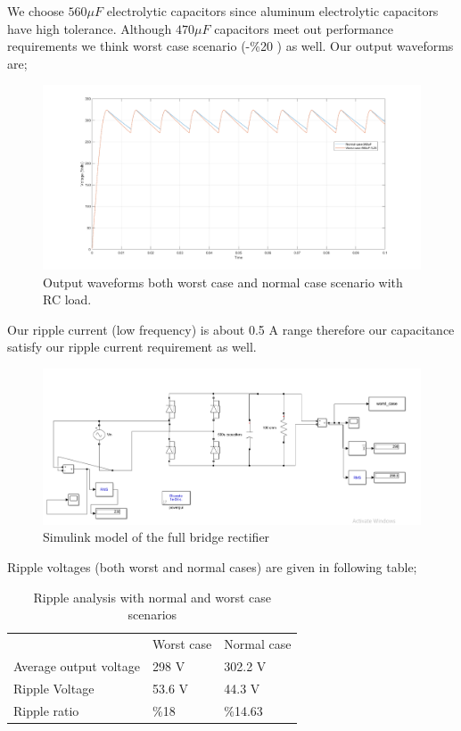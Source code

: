 \documentclass[fleqn, a4paper]{article}
\begin{document}
We choose $560 \mu F $ electrolytic capacitors since aluminum electrolytic capacitors have high tolerance. Although $470 \mu F $ capacitors meet out performance requirements we think worst case scenario (-\%20 ) as well. Our output waveforms are;
\begin{figure}[H]
  \includegraphics[width=\linewidth]{RC_load.png}
  \caption{Output waveforms both worst case and normal case scenario with RC load.}
  \label{fig:simulink2}
\end{figure}
Our ripple current (low frequency) is about 0.5 A range therefore our capacitance satisfy our ripple current requirement as well. 

\begin{figure}[H]
  \includegraphics[width=\linewidth]{Simulink_modelRC_load.PNG}
  \caption{Simulink model of the full bridge rectifier}
  \label{fig:simulink3}
\end{figure}
Ripple voltages (both worst and normal cases) are given in following table;

\begin{table}[H]
\centering
\begin{tabular}{lll}
                       & Worst case & Normal case \\
Average output voltage & 298 V      & 302.2 V     \\
Ripple Voltage         & 53.6 V     & 44.3 V      \\
Ripple ratio           & \%18       & \%14.63    
\end{tabular}
\caption{Ripple analysis with normal and worst case scenarios}
\end{table}
\end{document}
